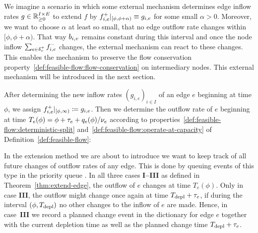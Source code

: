 We imagine a scenario in which some external mechanism determines edge inflow rates $g\in\mathbb{R}_{\geq 0}^{I\times E}$ to extend $f$ by ${f}^+_{i,e}\vert_{[\phi, \phi+\alpha)} \equiv g_{i,e}$ for some small $\alpha > 0$.
Moreover, we want to choose $\alpha$ at least so small, that no edge outflow rate changes within $[\phi, \phi + \alpha)$.
That way $b_{i,v}$ remains constant during this interval and once the node inflow $\sum_{e\in\delta^+_{v}}{f}^-_{i,e}$ changes, the external mechanism can react to these changes.
This enables the mechanism to pre\-serve the flow conservation property~\ref{def:feasible-flow:flow-conservation} on intermediary nodes.
This external mechanism will be introduced in the next section.

After determining the new inflow rates $(g_{i,e})_{i\in I}$ of an edge $e$ beginning at time $\phi$, we assign ${f}^+_{i,e}\vert_{[\phi,\infty)} \coloneqq g_{i,e}$.
Then we determine the outflow rate of $e$ beginning at time $T_e(\phi) = \phi + \tau_e + q_e(\phi)/\nu_e$ according to properties~\ref{def:feasible-flow:deterministic-split} and~\ref{def:feasible-flow:operate-at-capacity} of Definition~\ref{def:feasible-flow}:

In the extension method we are about to introduce we want to keep track of all future changes of outflow rates of any edge.
This is done by queuing events of this type in the priority queue .
In all three cases \textbf{I--III} as defined in Theorem~\ref{thm:extend-edge}, the outflow of $e$ changes at time $T_e(\phi)$.
Only in case \textbf{III}, the outflow might change once again at time $T_{\textnormal{depl}} + \tau_e$, if during the interval $(\phi, T_{\textnormal{depl}})$ no other changes to the inflow of $e$ are made.
Hence, in case~\textbf{III} we record a planned change event in the dictionary  for edge $e$ together with the current depletion time as well as the planned change time $T_{\textnormal{depl}} + \tau_e$.

